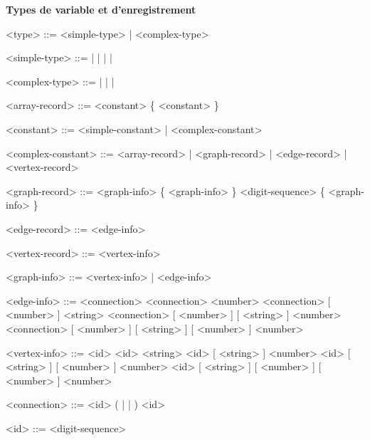 \documentclass[french]{article}
\begin{document}
		\textbf{Types de variable et d'enregistrement}
		\begin{grammar}
			<type> ::= <simple-type> | <complex-type>
			
			<simple-type> ::=  |  |  |  | 
			
			<complex-type> ::=  |  |  | 
			
			<array-record> ::= \lit{[} <constant> \{ \lit{,} <constant> \} \lit{]}
			
			<constant> ::= <simple-constant> | <complex-constant>
			
			<complex-constant> ::= <array-record> | <graph-record> | <edge-record> | <vertex-record>
			
			<graph-record> ::= \lit{\{} <graph-info> \{ \lit{,} <graph-info> \} \lit{\}}
			\alt \lit{\{} \lit{\#} <digit-sequence> \{ \lit{,} <graph-info> \} \lit{\}}
			
			<edge-record> ::= \lit{(} <edge-info> \lit{)}
			
			<vertex-record> ::= \lit{(} <vertex-info> \lit{)}
			
			<graph-info> ::= <vertex-info> | <edge-info>
			
			<edge-info> ::= <connection> 
			\alt <connection> 
			\alt <connection> \lit{:} [ <number> ] 
			\alt <connection> \lit{:} [ <number> ] \lit{:} [ <string> ] 
			\alt <connection> \lit{:} [ <number> ] \lit{:} [ <string> ] \lit{:} [ <number> ] 
			
			<vertex-info> ::= <id> 
			\alt <id> 
			\alt <id> \lit{:} [ <string> ] 
			\alt <id> \lit{:} [ <string> ] \lit{:} [ <number> ] 
			\alt <id> \lit{:} [ <string> ] \lit{:} [ <number> ] \lit{:} [ <number> ] 
			
			<connection> ::= <id> ( \lit{\textendash\textemdash} | \lit{\textemdash\textgreater} | \lit{\textless\textemdash} ) <id>
			
			<id> ::= <digit-sequence>
		\end{grammar}
		
\end{document}
